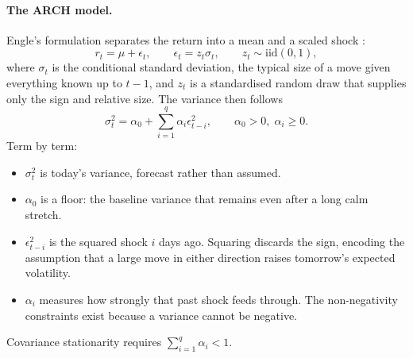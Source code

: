\documentclass[12pt,a4paper]{article}
\begin{document}
\paragraph{The ARCH model.} Engle's formulation separates the return into a
mean and a scaled shock \cite{Engle_1982}:
\begin{equation}
r_t = \mu + \epsilon_t ,
\qquad
\epsilon_t = z_t \sigma_t ,
\qquad
z_t \sim \mathrm{iid}(0,1),
\end{equation}
where $\sigma_t$ is the conditional standard deviation, the typical size of a
move given everything known up to $t-1$, and $z_t$ is a standardised random
draw that supplies only the sign and relative size. The variance then follows
\begin{equation}
\sigma_t^{2} = \alpha_0 + \sum_{i=1}^{q}\alpha_i \epsilon_{t-i}^{2},
\qquad \alpha_0 > 0,\; \alpha_i \ge 0 .
\end{equation}
Term by term:
\begin{itemize}
\item $\sigma_t^2$ is today's variance, forecast rather than assumed.
\item $\alpha_0$ is a floor: the baseline variance that remains even after a
      long calm stretch.
\item $\epsilon_{t-i}^{2}$ is the squared shock $i$ days ago. Squaring
      discards the sign, encoding the assumption that a large move in either
      direction raises tomorrow's expected volatility.
\item $\alpha_i$ measures how strongly that past shock feeds through. The
      non-negativity constraints exist because a variance cannot be negative.
\end{itemize}
Covariance stationarity requires $\sum_{i=1}^{q}\alpha_i < 1$.
\end{document}
